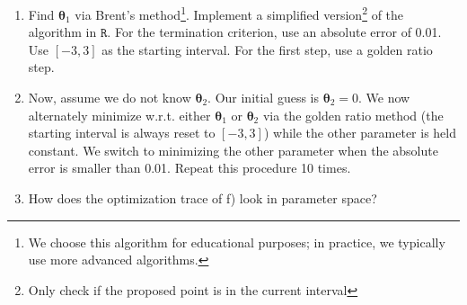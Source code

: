 \documentclass[a4paper]{article}
\begin{document}
{\begin{enumerate}
	\item Find $\bm{\theta}_1$ via Brent's method\footnote{We choose this algorithm for educational purposes; in practice, we typically use more advanced algorithms.}. Implement a simplified version\footnote{Only check if the proposed point is in the current interval} of the algorithm in $\texttt{R}.$ For the termination criterion, use an absolute error of 0.01. Use $[-3, 3]$ as the starting interval. For the first step, use a golden ratio step. 
\item Now, assume we do not know $\bm{\theta}_2.$ Our initial guess is $\bm{\theta}_2 = 0.$ We now alternately minimize w.r.t. either $\bm{\theta}_1$ or $\bm{\theta}_2$ via the golden ratio method (the starting interval is always reset to $[-3, 3]$) while the other parameter is held constant. We switch to minimizing the other parameter when the absolute error is smaller than 0.01. Repeat this procedure 10 times.
\item How does the optimization trace of f) look in parameter space?

\end{enumerate}
}
\end{document}
